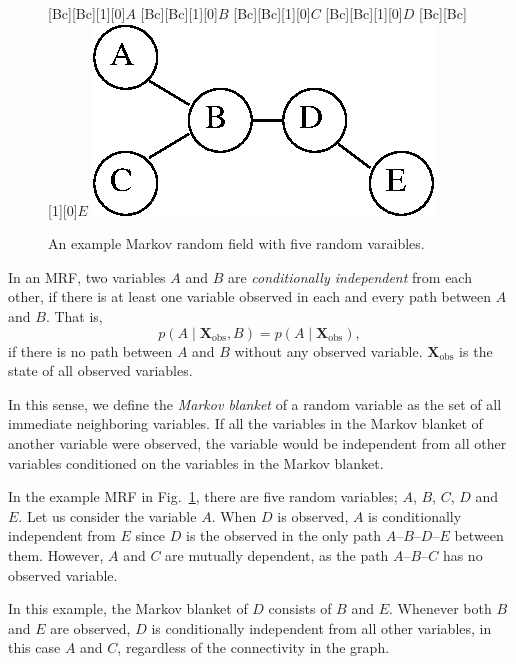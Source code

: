 \documentclass[dissertation,nocontribution,draft*]{aaltoseries}
\newcommand{\matr}[1]{\mathbf{#1}}
\newcommand{\mX}[0]{\matr{X}}
\begin{document}
\begin{figure}[t]
    \centering
    [Bc][Bc][1][0]{$A$}
    [Bc][Bc][1][0]{$B$}
    [Bc][Bc][1][0]{$C$}
    [Bc][Bc][1][0]{$D$}
    [Bc][Bc][1][0]{$E$}
    \includegraphics[width=0.4\columnwidth]{figures/mrf.eps}
    \caption{An example Markov random field with five random
    varaibles.}
    \label{fig:mrf}
\end{figure}


In an MRF, two variables $A$ and $B$ are
\textit{conditionally independent} from each other, if there
is at least one variable observed in each and every path
between $A$ and $B$.
That is, 
\[
p(A \mid \mX_{\text{obs}}, B) = p(A \mid \mX_{\text{obs}}),
\]
if there is no path between $A$ and $B$ without any observed
variable. $\mX_{\text{obs}}$ is the state of all observed
variables.

In this sense, we define the \textit{Markov blanket} of a
random variable as the set of all immediate neighboring
variables. If all the variables in the Markov blanket of another
variable were observed, the variable would be independent from all
other variables conditioned on the variables in the Markov
blanket.

In the example MRF in Fig.~\ref{fig:mrf}, there are five
random variables; $A$, $B$, $C$, $D$ and $E$. Let us
consider the variable $A$. When $D$ is observed, $A$ is
conditionally independent from $E$ since $D$ is the observed
in the only path $A$--$B$--$D$--$E$ between them. However,
$A$ and $C$ are mutually dependent, as the path
$A$--$B$--$C$ has no observed variable.

In this example, the Markov blanket of $D$ consists of $B$ and
$E$. Whenever both $B$ and $E$ are observed, $D$ is
conditionally independent from all other variables, in this
case $A$ and $C$, regardless of the connectivity in the
graph.
\end{document}
